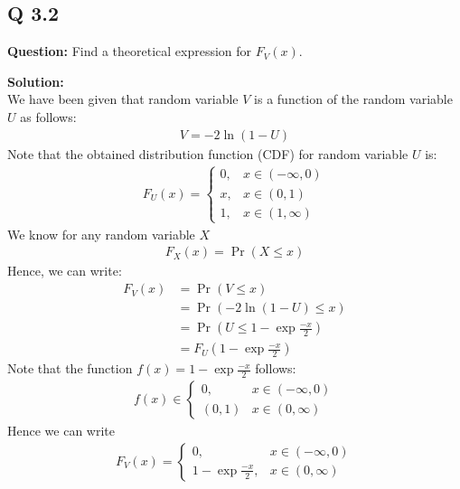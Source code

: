 \documentclass[journal,12pt,twocolumn]{IEEEtran}
\begin{document}
\subsection{Q 3.2}
\noindent \textbf{Question:}
Find a theoretical expression for $F_V(x)$.

\noindent \textbf{Solution:}\\We have been given that random variable $V$ is a function of the random variable $U$ as follows:
\begin{align}
    V = -2\ln{(1 - U)}
\end{align}
	Note that the obtained distribution function (CDF) for random variable $U$ is:
\begin{align}
    	F_U(x) =
	\begin{cases}
		0, & x \in (-\infty, 0) \\
		x, & x \in (0, 1) \\
		1, & x \in (1, \infty)
	\end{cases}
\end{align}
We know for any random variable $X$
\begin{align}
    F_X(x) = \Pr(X \leq x)
\end{align}
	Hence, we can write:
\begin{align}
	F_V(x) &= \Pr(V \leq x) \\
	&= \Pr(-2\ln{(1 - U)} \leq x)\\
	&= \Pr(U \leq 1 - \exp{\frac{-x}{2}})\\
	&= F_U(1 - \exp{\frac{-x}{2}})
\end{align}
Note that the function $f(x) = 1 - \exp{\frac{-x}{2}}$ follows:
\begin{align}
    f(x) \in
	\begin{cases}
	    {0}, & x \in (-\infty, 0) \\
	    (0, 1) & x \in (0, \infty)
	\end{cases}
\end{align}
Hence we can write
\begin{align}
	F_V(x) =
	\begin{cases}
	    0, & x \in (-\infty, 0) \\
	    1 - \exp{\frac{-x}{2}}, & x \in (0, \infty)
    	\end{cases}
\end{align}
\end{document}
